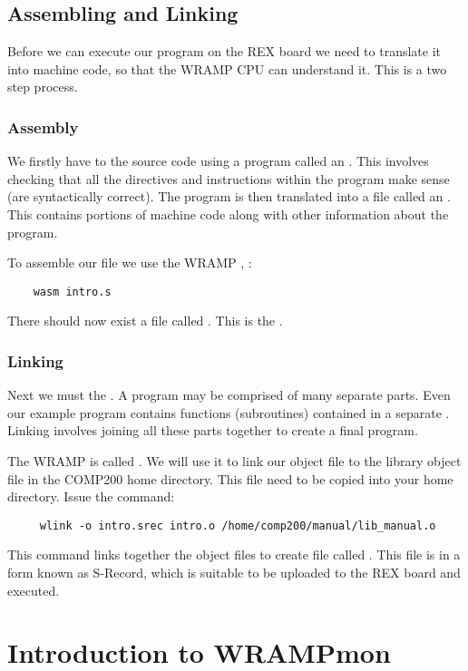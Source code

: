 \subsection{Assembling and Linking}
Before we can execute our program on the REX board we need to translate it 
into machine code, so that the WRAMP CPU can understand it.  This is a two
step process.

\subsubsection{Assembly}
We firstly have to  the source code using a program
called an .  This involves checking that all the
directives and instructions within the program make sense (are
syntactically correct).  The program is then translated into a file
called an . This contains portions of machine code
along with other information about the program.

To assemble our file we use the WRAMP , :
\begin{verbatim}
    wasm intro.s
\end{verbatim}

There should now exist a file called .  This is the 
.

\subsubsection{Linking}
Next we must  the .  A program may be
comprised of many separate parts.  Even our example program contains
functions (subroutines) contained in a separate . Linking
involves joining all these parts together to create a final program.

The WRAMP  is called .  We will use it to
link our object file to the library object file in the COMP200 home directory.
This file  need to be copied into your home directory.
Issue the command:
\begin{verbatim}
     wlink -o intro.srec intro.o /home/comp200/manual/lib_manual.o
\end{verbatim}

This command links together the object files to create file called
.  This file is in a form known as S-Record, which
is suitable to be uploaded to the REX board and executed.

%
%
%
\section{Introduction to WRAMPmon}
\label{intro:wrampmon}

